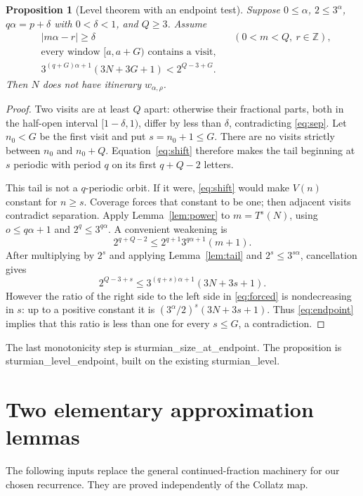 \documentclass[11pt]{article}
\newtheorem{proposition}[theorem]{Proposition}
\theoremstyle{remark}
\newcommand{\Z}{\mathbb Z}
\newcommand{\code}[1]{{\small\ttfamily #1}}
\begin{document}
\begin{proposition}[Level theorem with an endpoint test]\label{prop:level}
Suppose $0\le\alpha$, $2\le3^\alpha$, $q\alpha=p+\delta$ with
$0<\delta<1$, and $Q\ge3$. Assume
\begin{align}
&|m\alpha-r|\ge\delta
 &&(0<m<Q,\ r\in\Z),\label{eq:sep}\\
&\text{every window }[a,a+G)\text{ contains a visit},\label{eq:vis}\\
&3^{(q+G)\alpha+1}(3N+3G+1)<2^{Q-3+G}.\label{eq:endpoint}
\end{align}
Then $N$ does not have itinerary $w_{\alpha,\rho}$.
\end{proposition}
\begin{proof}
Two visits are at least $Q$ apart: otherwise their fractional parts,
both in the half-open interval $[1-\delta,1)$, differ by less than
$\delta$, contradicting \eqref{eq:sep}. Let $n_0<G$ be the first visit
and put $s=n_0+1\le G$. There are no visits strictly between $n_0$ and
$n_0+Q$. Equation~\eqref{eq:shift} therefore makes the tail beginning at
$s$ periodic with period $q$ on its first $q+Q-2$ letters.

This tail is not a $q$-periodic orbit. If it were, \eqref{eq:shift} would
make $V(n)$ constant for $n\ge s$. Coverage forces that constant to be
one; then adjacent visits contradict separation. Apply
Lemma~\ref{lem:power} to $m=T^s(N)$, using $o\le q\alpha+1$ and
$2^q\le3^{q\alpha}$. A convenient weakening is
\[
2^{q+Q-2}\le2^{q+1}3^{q\alpha+1}(m+1).
\]
After multiplying by $2^s$ and applying Lemma~\ref{lem:tail} and
$2^s\le3^{s\alpha}$, cancellation gives
\begin{equation}\label{eq:forced}
2^{Q-3+s}\le3^{(q+s)\alpha+1}(3N+3s+1).
\end{equation}
However the ratio of the right side to the left side in
\eqref{eq:forced} is nondecreasing in $s$: up to a positive constant it
is $(3^\alpha/2)^s(3N+3s+1)$. Thus \eqref{eq:endpoint} implies that this
ratio is less than one for every $s\le G$, a contradiction.
\end{proof}
The last monotonicity step is \code{sturmian\_\allowbreak{}size\_\allowbreak{}at\_\allowbreak{}endpoint}.
The proposition is \code{sturmian\_\allowbreak{}level\_\allowbreak{}endpoint}, built on the
existing \code{sturmian\_\allowbreak{}level}.

\section{Two elementary approximation lemmas}
The following inputs replace the general continued-fraction machinery for
our chosen recurrence. They are proved independently of the Collatz map.
\end{document}
